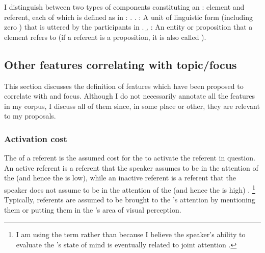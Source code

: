 
I distinguish between two types of components constituting an :
 element and  referent,
each of which is defined as in \Next:
\ex.
	\a. : {A unit of linguistic form (including zero ) that is uttered by the participants in .}
	\b. : {An entity or proposition that a  element refers to (if a referent is a proposition, it is also called ).}



\subsection{Other features correlating with topic/focus}\label{FrameworkOthFeatures}

This section discusses the definition of features which have been
proposed to correlate with  and focus.
Although I do not necessarily annotate all the features in my corpus,
I discuss all of them
since, in some place or other, they are relevant to my proposals.



\subsubsection{Activation cost}\label{FrameworkActivation}
The  of a referent is the assumed cost for the  to activate the referent in question.
An active referent is a referent
that the speaker assumes to be in the attention of the  (and hence the  is low),
while an inactive referent is a referent
that the speaker does not assume to be in the attention of the  (and hence the  is high)
\cite[see also][inter alia]{chafe94}.%
	\footnote{
	I am using the term  rather than 
	because I believe the speaker's ability to evaluate the 's state of mind is eventually related to joint attention \cite{tomasello99}.
	}
Typically,
referents are assumed to be brought to the 's attention
by mentioning them or putting them in the 's area of visual perception.

